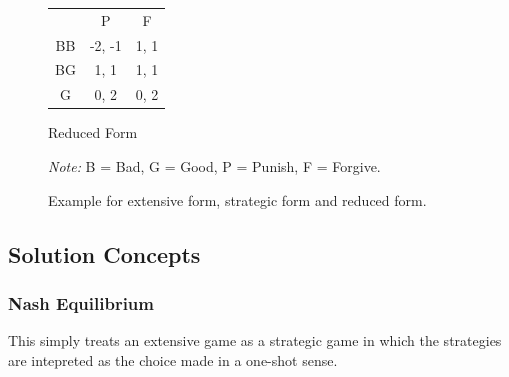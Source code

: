 \begin{figure}[h]
\begin{minipage}[b]{0.4\textwidth}
        \begin{subtable}{\linewidth}
            \centering
            \begin{tabular}{ccc}
                                    & P                           & F                         \\ \cline{2-3} 
            \multicolumn{1}{c|}{BB} & \multicolumn{1}{c|}{-2, -1} & \multicolumn{1}{c|}{1, 1} \\ \cline{2-3} 
            \multicolumn{1}{c|}{BG} & \multicolumn{1}{c|}{1, 1}   & \multicolumn{1}{c|}{1, 1} \\ \cline{2-3} 
            \multicolumn{1}{c|}{G}  & \multicolumn{1}{c|}{0, 2}   & \multicolumn{1}{c|}{0, 2} \\ \cline{2-3} 
            \end{tabular}
            \caption{Reduced Form}
            \label{tab:reduced}
        \end{subtable}
    \end{minipage}
    \par\vspace{1\baselineskip}  %
    {\footnotesize\raggedright %
    \textit{Note:} B = Bad, G = Good, P = Punish, F = Forgive.}
    \caption{Example for extensive form, strategic form and reduced form. }
\end{figure}

\subsection{Solution Concepts}
\subsubsection{Nash Equilibrium}
This simply treats an extensive game as a strategic game in which the strategies are intepreted as the choice made in a one-shot sense.
\begin{definition}
    
\end{definition}

